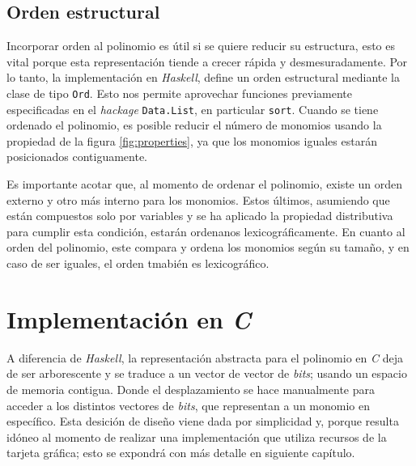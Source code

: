 \subsection{Orden estructural}

Incorporar orden al polinomio es útil si se quiere reducir su estructura, esto es vital porque esta representación tiende a crecer rápida y desmesuradamente. Por lo tanto, la implementación en \textit{Haskell}, define un orden estructural mediante la clase de tipo \texttt{Ord}. Esto nos permite aprovechar funciones previamente especificadas en el \textit{hackage} \texttt{Data.List}, en particular \texttt{sort}. Cuando se tiene ordenado el polinomio, es posible reducir el número de monomios usando la propiedad de la figura \ref{fig:properties}, ya que los monomios iguales estarán posicionados contiguamente.


Es importante acotar que, al momento de ordenar el polinomio, existe un orden externo y otro más interno para los monomios. Estos últimos, asumiendo que están compuestos solo por variables y se ha aplicado la propiedad distributiva para cumplir esta condición, estarán ordenanos lexicográficamente. En cuanto al orden del polinomio, este compara y ordena los monomios según su tamaño, y en caso de ser iguales, el orden tmabién es lexicográfico.


\section{Implementación en \textit{C}}

A diferencia de \textit{Haskell}, la representación abstracta para el polinomio en \textit{C} deja de ser arborescente y se traduce a un vector de vector de \textit{bits}; usando un espacio de memoria contigua. Donde el desplazamiento se hace manualmente para acceder a los distintos vectores de \textit{bits}, que representan a un monomio en específico. Esta desición de diseño viene dada por simplicidad y, porque resulta idóneo al momento de realizar una implementación que utiliza recursos de la tarjeta gráfica; esto se expondrá con más detalle en siguiente capítulo.

